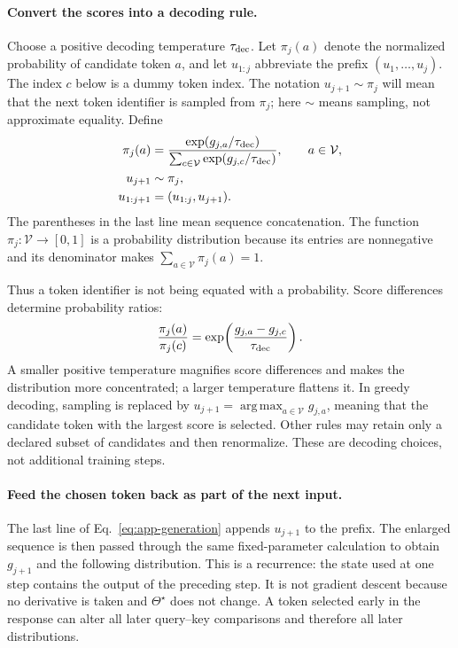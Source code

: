 \documentclass[
  aps,
  reprint,
  superscriptaddress,
  floatfix,
  nofootinbib,
  longbibliography
]{revtex4-2}
\DeclareMathOperator*{\argmax}{arg\,max}
\begin{document}
\paragraph{Convert the scores into a decoding rule.}
Choose a positive decoding temperature $\tau_{\rm dec}$.  Let
$\pi_j(a)$ denote the normalized probability of candidate token $a$, and let
$u_{1:j}$ abbreviate the prefix $(u_1,\ldots,u_j)$.  The index $c$ below is a
dummy token index.  The notation $u_{j+1}\sim\pi_j$ will mean that the next
token identifier is sampled from $\pi_j$; here $\sim$ means sampling, not
approximate equality.  Define
%
\begin{align}
\pi_j(a)
&=
\frac{\exp(g_{j,a}/\tau_{\rm dec})}
{\sum_{c\in\mathcal V}
\exp(g_{j,c}/\tau_{\rm dec})},
\qquad a\in\mathcal V,
\nonumber\\
u_{j+1}&\sim\pi_j,
\nonumber\\
u_{1:j+1}&=(u_{1:j},u_{j+1}).
\label{eq:app-generation}
\end{align}
%
The parentheses in the last line mean sequence concatenation.  The function
$\pi_j:\mathcal V\to[0,1]$ is a probability distribution because its entries
are nonnegative and its denominator makes
$\sum_{a\in\mathcal V}\pi_j(a)=1$.

Thus a token identifier is not being equated with a probability.  Score
differences determine probability ratios:
\begin{equation}
\label{eq:app-temperature-ratio}
\frac{\pi_j(a)}{\pi_j(c)}
=\exp\!\left(
\frac{g_{j,a}-g_{j,c}}{\tau_{\rm dec}}
\right).
\end{equation}
A smaller positive temperature magnifies score differences and makes the
distribution more concentrated; a larger temperature flattens it.  In greedy
decoding, sampling is replaced by
$u_{j+1}=\argmax_{a\in\mathcal V}g_{j,a}$, meaning that the candidate token with
the largest score is selected.  Other rules may retain only a
declared subset of candidates and then renormalize.  These are decoding choices,
not additional training steps.

\paragraph{Feed the chosen token back as part of the next input.}
The last line of Eq.~\eqref{eq:app-generation} appends $u_{j+1}$ to the prefix.
The enlarged sequence is then passed through the same fixed-parameter
calculation to obtain $g_{j+1}$ and the following distribution.  This is a
recurrence: the state used at one step contains the output of the preceding
step.  It is not gradient descent because no derivative is taken and
$\Theta^\star$ does not change.  A token selected early in the response can
alter all later query--key comparisons and therefore all later distributions.
\end{document}
